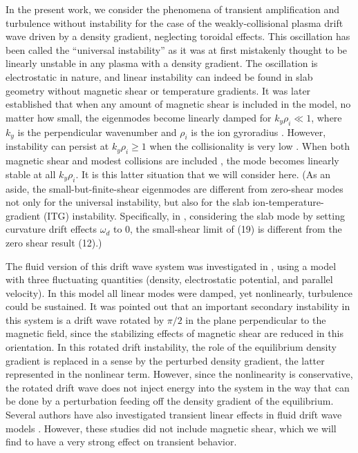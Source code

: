 \documentclass[12pt,superscriptaddress]{revtex4}
\begin{document}
In the present work, we consider the phenomena of transient amplification and turbulence
without instability for the case of the weakly-collisional
plasma drift wave driven by a density gradient\cite{Galeev,Krall3},
neglecting toroidal effects.
This oscillation has been called the ``universal instability'' as it was at first
mistakenly thought to be linearly unstable in any plasma with a density gradient.
The oscillation is electrostatic in nature, and linear instability can indeed be found
in slab geometry without magnetic shear or temperature gradients.
It was later established that when any amount of magnetic shear is included in the model,
no matter how small,
the eigenmodes become linearly damped for $k_y \rho_i \ll 1$,
where $k_y$ is the perpendicular wavenumber and $\rho_i$ is the ion gyroradius
\cite{Ross, Tsang, Antonsen}.
However, instability can persist at $k_y \rho_i \ge 1$ when the collisionality is
very low \cite{usUniversalInstability}.
When both magnetic shear and modest collisions are included \cite{usUniversalInstability},
the mode becomes linearly stable at all $k_y \rho_i$.
It is this latter situation that we will consider here.
(As an aside, the small-but-finite-shear eigenmodes
are different from zero-shear modes not only for the
universal instability, but also for the slab ion-temperature-gradient (ITG) instability.
Specifically, in \cite{Plunk2014}, considering the slab mode by setting
curvature drift effects $\omega_d$ to 0, the small-shear limit of (19) is different from
the zero shear result (12).)

The fluid version of this drift wave system was investigated in \cite{Drake},
using a model with three fluctuating quantities (density, electrostatic potential, and parallel velocity).
In this model all linear modes were damped, yet nonlinearly, turbulence could be sustained.
It was pointed out that an important secondary
instability in this system is a drift wave rotated by $\pi/2$ in the plane
perpendicular to the magnetic field, since the stabilizing effects of magnetic
shear are reduced in this orientation.
In this rotated drift instability, the role of the equilibrium density gradient is replaced in a sense by the
perturbed density gradient, the latter represented in the nonlinear term.
However, since the nonlinearity is conservative, the rotated drift wave does not inject energy
into the system in the way that can be done by a perturbation feeding off the density gradient of the equilibrium.
Several authors have also investigated transient linear effects in fluid drift wave models
\cite{Camargo, Friedman1, Friedman2}. However, these studies did not
include magnetic shear, which we will find to have a very strong effect on
transient behavior.
\end{document}

